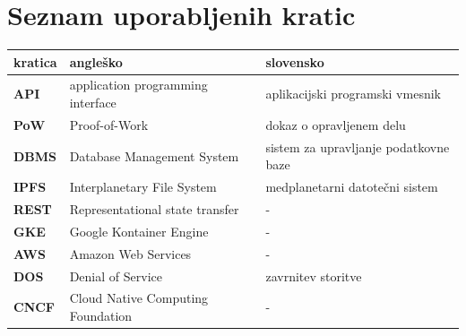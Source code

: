 \documentclass[a4paper, 12pt]{book}
\newcommand{\clearemptydoublepage}{\newpage{\pagestyle{empty}\cleardoublepage}}
\begin{document}
\clearemptydoublepage


\pagestyle{empty}
\def\thepage{}%
\tableofcontents{}


\clearemptydoublepage


\chapter*{Seznam uporabljenih kratic}  %

\noindent\begin{tabular}{p{}|p{}|p{}}    %
  {\bf kratica} & {\bf angleško}                             & {\bf slovensko} \\ \hline
  {\bf API}      & application programming interface & aplikacijski programski vmesnik \\
  {\bf PoW} & Proof-of-Work & dokaz o opravljenem delu \\
  {\bf DBMS}   & Database Management System & sistem za upravljanje podatkovne baze \\
  {\bf IPFS} & Interplanetary File System & medplanetarni datotečni sistem \\
  {\bf REST} & Representational state transfer & - \\
  {\bf GKE} & Google Kontainer Engine & - \\
  {\bf AWS} & Amazon Web Services & - \\
  {\bf DOS} & Denial of Service & zavrnitev storitve \\
  {\bf CNCF} & Cloud Native Computing Foundation & - \\
\end{tabular}
\end{document}
